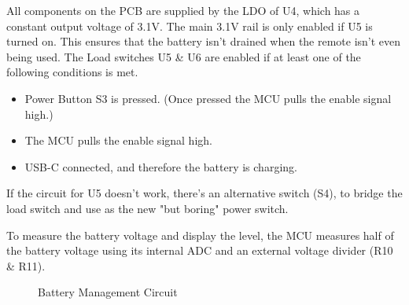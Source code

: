 All components on the PCB are supplied by the LDO of U4, which has a constant output voltage of 3.1V. The main 3.1V rail is only enabled if U5 is turned on. This ensures that the battery isn't drained when the remote isn't even being used. The Load switches U5 \& U6 are enabled if at least one of the following conditions is met.
\begin{itemize}
    \item Power Button S3 is pressed. (Once pressed the MCU pulls the enable signal high.)
    \item The MCU pulls the enable signal high.
    \item USB-C connected, and therefore the battery is charging.
\end{itemize}
If the circuit for U5 doesn't work, there's an alternative switch (S4), to bridge the load switch and use as the new "but boring" power switch.

To measure the battery voltage and display the level, the MCU measures half of the battery voltage using its internal ADC and an external voltage divider (R10 \& R11).

\begin{figure}[H]
	\centering
	\caption{Battery Management Circuit}
	\label{fig:Battery Management Circuit}
\end{figure}

